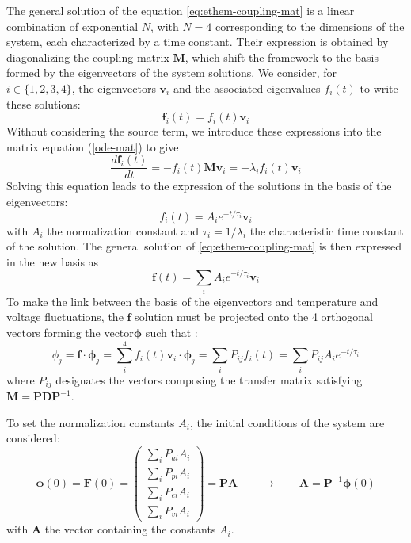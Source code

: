 The general solution of the equation \ref{eq:ethem-coupling-mat} is a linear combination of exponential $N$, with $N=4$ corresponding to the dimensions of the system, each characterized by a time constant. Their expression is obtained by diagonalizing the coupling matrix $\bm{M}$, which shift the framework to the basis formed by the eigenvectors of the system solutions. We consider, for $i \in \{1,2,3,4\}$, the eigenvectors $\bm{v}_i$ and the associated eigenvalues $f_i(t)$ to write these solutions:
\begin{equation}
\label{eq:eigen-solution}
\bm{f}_i(t) = f_i(t) \bm{v}_i
\end{equation}
Without considering the source term, we introduce these expressions into the matrix equation (\ref{ode-mat}) to give
\begin{equation}
\label{eq:eigen-solution-ode}
\frac{d \bm{f}_i(t)}{d t} = -f_i(t) \bm{M} \bm{v}_i = -\lambda_i f_i(t) \bm{v}_i
\end{equation}
Solving this equation leads to the expression of the solutions in the basis of the eigenvectors:
\begin{equation}
f_i(t) = A_i e^{-t/\tau_i} \bm{v}_i
\end{equation}
with $A_i$ the normalization constant and $\tau_i=1/\lambda_i$ the characteristic time constant of the solution. The general solution of \ref{eq:ethem-coupling-mat} is then expressed in the new basis as
\begin{equation}
\label{eq:eigein-solution-expr}
\bm{f}(t) = \sum_i A_i e^{-t/\tau_i} \bm{v}_i
\end{equation}
To make the link between the basis of the eigenvectors and temperature and voltage fluctuations, the $\bm{f}$ solution must be projected onto the 4 orthogonal vectors forming the vector$\bm{\phi}$ such that :
\begin{equation}
\label{eq:gen-solution}
\phi_j = \bm{f} \cdot \bm{\phi}_j = \sum_i^4 f_i(t) \bm{v}_i \cdot \bm{\phi}_j = \sum_i P_{ij} f_i(t) = \sum_i P_{ij} A_i e^{-t/\tau_i}
\end{equation}
where $P_{ij}$ designates the vectors composing the transfer matrix satisfying $\bm{M}=\bm{P} \bm{D} \bm{P}^{-1}$.

To set the normalization constants $A_i$, the initial conditions of the system are considered:
\begin{equation}
\bm{\phi}(0) = \bm{F}(0) =
\left( \begin{array}{c}
\sum_i P_{ai} A_i\\
\sum_i P_{pi} A_i\\
\sum_i P_{ei} A_i\\
\sum_i P_{vi} A_i
\end{array} \right) = \bm{P} \bm{A}
\qquad \longrightarrow \qquad \bm{A}=\bm{P}^{-1} \bm{\phi} (0)
\label{eq:ethem-initial-value}
\end{equation}
with $\bm{A}$ the vector containing the constants $A_i$.


